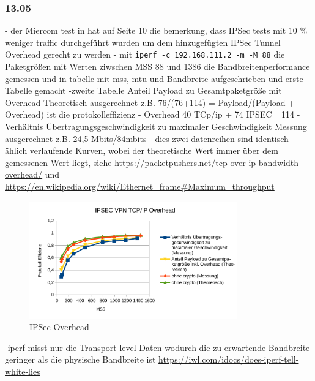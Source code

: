 \documentclass[english,runningheads,a4paper]{llncs}[2018/03/10]
\begin{document}
\subsubsection{13.05}
- der Miercom test in  hat auf Seite 10 die bemerkung, dass IPSec tests mit 10 \% weniger traffic durchgeführt wurden um dem hinzugefügten IPSec Tunnel Overhead gerecht zu werden
- mit \texttt{iperf -c 192.168.111.2 -m -M 88} die Paketgrößen mit Werten ziwschen MSS 88 und 1386 die Bandbreitenperformance gemessen
und in tabelle mit mss, mtu und Bandbreite aufgeschrieben und erste Tabelle gemacht
-zweite Tabelle Anteil Payload zu Gesamtpaketgröße mit Overhead Theoretisch ausgerechnet z.B. 76/(76+114) = Payload/(Payload + Overhead) ist die protokolleffizienz
- Overhead 40 TCp/ip + 74 IPSEC =114
-Verhältnis Übertragungsgeschwindigkeit zu maximaler Geschwindigkeit Messung ausgerechnet z.B. 24,5 Mbits/84mbits
- dies zwei datenreihen sind identisch ählich verlaufende Kurven, wobei der theoretische Wert immer über dem gemessenen Wert liegt, siehe 
\url{https://packetpushers.net/tcp-over-ip-bandwidth-overhead/} und \url{https://en.wikipedia.org/wiki/Ethernet_frame#Maximum_throughput}
\begin{figure}
	\centering
	\includegraphics[width=0.8\textwidth]{images/tcpipoverhead.pdf}
	\caption{IPSec Overhead}
	\label{fig:tcpipoverhead}
\end{figure}
-iperf misst nur die Transport level Daten wodurch die zu erwartende Bandbreite geringer als die physische Bandbreite ist \url{https://iwl.com/idocs/does-iperf-tell-white-lies}
\end{document}
